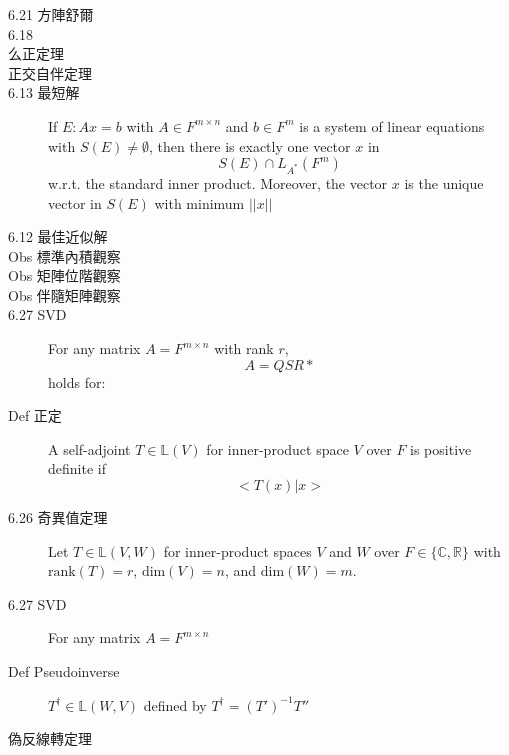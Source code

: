 \documentclass[9pt, twocolumn]{extarticle}
\newcommand{\vsdim}{\ensuremath{\text{dim}}}
\newcommand{\rank}{\ensuremath{\text{rank}}}
\newcommand{\realnum}{\mathbb{R}}
\newcommand{\complexnum}{\mathbb{C}}
\newcommand{\ltrans}{\mathbb{L}}
\begin{document}
\begin{description}
    \item[6.21 方陣舒爾]
    \item[6.18]
        
    \item[么正定理] 
    \item[正交自伴定理]
    \item[6.13 最短解] If $E: Ax = b$ with $A \in F^{m\times n}$ and $b \in F^m$ is a system of linear equations with $S(E) \neq \emptyset$, then there is exactly one vector $x$ in \[S(E) \cap L_{A^*}(F^m)\] w.r.t. the standard inner product. Moreover, the vector $x$ is the unique vector in $S(E)$ with minimum $||x||$
    \item[6.12 最佳近似解]
    \item[Obs 標準內積觀察]
    \item[Obs 矩陣位階觀察]
    \item[Obs 伴隨矩陣觀察]
        
    \item[6.27 SVD] For any matrix $A = F^{m\times n}$ with rank $r$, \[A = QSR*\] holds for:

    \item[Def 正定] A self-adjoint $T \in \ltrans(V)$ for inner-product space $V$ over $F$ is positive definite if \[<T(x)|x>\]

    \item[6.26 奇異值定理] Let $T \in \ltrans(V, W)$ for inner-product spaces $V$ and $W$ over $F \in \{\complexnum, \realnum\}$ with $\rank(T)=r$, $\vsdim(V) = n$, and $\vsdim(W) = m$.
    \item[6.27 SVD] For any matrix $A = F^{m\times n}$

    \item[Def Pseudoinverse] $T^\dagger \in \ltrans(W, V)$ defined by $T^\dagger = (T')^{-1}T''$
    \item[偽反線轉定理]
\end{description}
\end{document}
